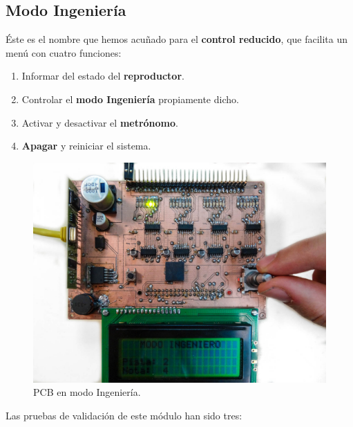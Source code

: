 

\subsection{Modo Ingeniería}

Éste es el nombre que hemos acuñado para el \textbf{control reducido}, que facilita un menú con cuatro funciones:

\begin{enumerate}
	\item Informar del estado del \textbf{reproductor}.
	\item Controlar el \textbf{modo Ingeniería} propiamente dicho.
	\item Activar y desactivar el \textbf{metrónomo}.
	\item \textbf{Apagar} y reiniciar el sistema.
\end{enumerate}

\smallskip

\begin{figure}[H]
	\noindent \begin{centering}
		\includegraphics[width=\linewidth*3/4]{capitulo6/pcb_ingeniero}
		\par\end{centering}
	\smallskip
	\caption{\label{fig:pcb_ingeniero} PCB en modo Ingeniería.}
\end{figure} 

\smallskip

Las pruebas de validación de este módulo han sido tres:

